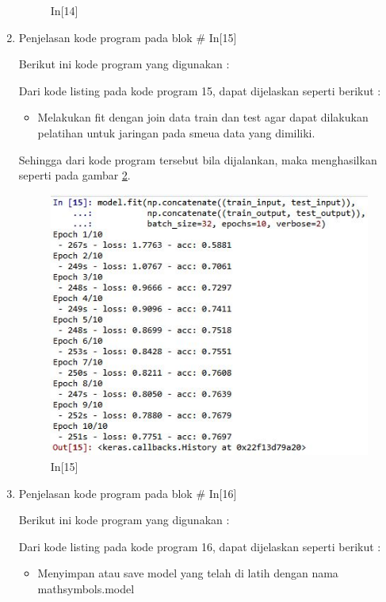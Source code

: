 \begin{enumerate}
\begin{figure}[!htbp]
\caption{In[14]}
\label{c7t_21}
\end{figure}
\item Penjelasan kode program pada blok \# In[15]
\par Berikut ini kode program yang digunakan :

\par Dari kode listing pada kode program 15, dapat dijelaskan seperti berikut :
\begin{itemize}
\item Melakukan fit dengan join data train dan test agar dapat dilakukan pelatihan untuk jaringan pada smeua data yang dimiliki.
\end{itemize}
\par Sehingga dari kode program tersebut bila dijalankan, maka menghasilkan seperti pada gambar \ref{c7t_22}.
\begin{figure}[!htbp]
\centerline{\includegraphics[width=1\textwidth]{figures/c7t/22.JPG}}
\caption{In[15]}
\label{c7t_22}
\end{figure}
\item Penjelasan kode program pada blok \# In[16]
\par Berikut ini kode program yang digunakan :

\par Dari kode listing pada kode program 16, dapat dijelaskan seperti berikut :
\begin{itemize}
\item Menyimpan atau save model yang telah di latih dengan nama mathsymbols.model 

\end{itemize}
\end{enumerate}
